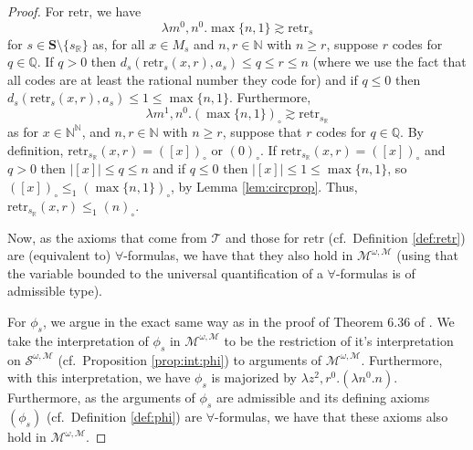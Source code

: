 \documentclass[11pt]{amsart}
\theoremstyle{definition}
\theoremstyle{remark}
\def\NN{\mathbb{N}}
\def\QQ{\mathbb{Q}}
\def\RR{\mathbb{R}}
\begin{document}
\begin{proof}
For $\mathrm{retr}$, we have 
\[
\lambda m^0,n^0.\max\{n,1\} \gtrsim \mathrm{retr}_s
\]
for $s \in \mathbf{S}\setminus \{s_\RR\}$ as, for all $x \in M_s$ and $n,r \in \NN$ with $n \ge r$, suppose $r$ codes for $q \in \QQ$. If $q>0$ then $d_s(\mathrm{retr}_s(x,r),a_s)\le q \le r \le n$ (where we use the fact that all codes are at least the rational number they code for) and if $q\le 0$ then $d_s(\mathrm{retr}_s(x,r),a_s)\le 1  \le \max\{n,1\} $. Furthermore, 
\[
\lambda m^1,n^0.(\max\{n,1\} )_\circ \gtrsim \mathrm{retr}_{s_\RR}
\]
as for $x \in \NN^\NN$, and $n,r \in \NN$ with $n \ge r$, suppose that $r$ codes for $q \in \QQ$. By definition, $\mathrm{retr}_{s_\RR}(x,r)= ([x])_\circ$ or $(0)_\circ$. If $\mathrm{retr}_{s_\RR}(x,r)= ([x])_\circ$ and $q>0$ then $|[x]|\le q \le n$ and if $q\le 0$ then $|[x]|\le 1 \le \max\{n,1\}$, so $([x])_\circ \le_1 (\max\{n,1\} )_\circ$, by Lemma \ref{lem:circprop}. Thus, $\mathrm{retr}_{s_\RR}(x,r)\le_1 (n)_\circ$.

Now, as the axioms that come from $\mathcal{T}$ and those for $\mathrm{retr}$ (cf.\ Definition \ref{def:retr}) are (equivalent to) $\forall$-formulas, we have that they also hold in $\mathcal{M}^{\omega,\mathscr{M}}$ (using that the variable bounded to the universal quantification of a $\forall$-formulas is of admissible type).

For $\phi_s$, we argue in the exact same way as in the proof of Theorem 6.36 of \cite{GuK2016}. We take the interpretation of $\phi_s$ in $\mathcal{M}^{\omega,\mathscr{M}}$ to be the restriction of it's interpretation on $\mathcal{S}^{\omega,\mathscr{M}}$ (cf.\ Proposition \ref{prop:int:phi}) to arguments of $\mathcal{M}^{\omega,\mathscr{M}}$. Furthermore, with this interpretation, we have $\phi_s$ is majorized by $\lambda z^{2},r^0.(\lambda n^0.  n)$. Furthermore, as the arguments of $\phi_s$ are admissible and its defining axioms $(\phi_s)$ (cf.\ Definition \ref{def:phi}) are $\forall$-formulas, we have that these axioms also hold in $\mathcal{M}^{\omega,\mathscr{M}}$.


\end{proof}
\end{document}
